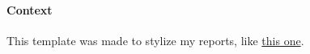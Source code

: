 \paragraph{Context} \label{sec:context}

This template was made to stylize my reports, like \href{https://github.com/apehex/web3-evasion-techniques/blob/main/report/apehex.pdf}{this one}.
